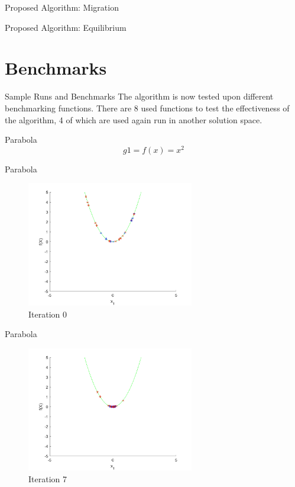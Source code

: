 \documentclass[xcolor=table]{beamer}
\begin{document}
\begin{frame}{Proposed Algorithm: Migration}
\end{frame}

\begin{frame}{Proposed Algorithm: Equilibrium}
\end{frame}

\section{Benchmarks}

\begin{frame}{Sample Runs and Benchmarks}
The algorithm is now tested upon different benchmarking functions. There are 8 used functions to test the effectiveness of the algorithm, 4 of which are used again run in another solution space.
\end{frame}
\begin{frame}{Parabola}
$$
  g1=f(x) = x^2
$$
\end{frame}
\begin{frame}{Parabola}
  \begin{figure}[h]
  \begin{center}
    \includegraphics[width=0.65\textwidth]{img/smpl/circ/loa-iter-0}
    \caption{Iteration 0}
  \end{center}
  \end{figure}
\end{frame}
\begin{frame}{Parabola}
  \begin{figure}[h]
  \begin{center}
    \includegraphics[width=0.65\textwidth]{img/smpl/circ/loa-iter-7}
    \caption{Iteration 7}
  \end{center}
  \end{figure}
\end{frame}
\end{document}
